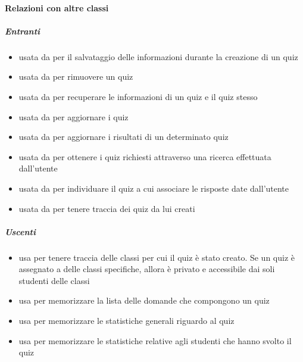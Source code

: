 \paragraph{Relazioni con altre classi}
\subparagraph{Entranti}
\begin{itemize}
\item usata da  per il salvataggio delle informazioni durante la creazione di un quiz
\item usata da  per rimuovere un quiz
\item usata da  per recuperare le informazioni di un quiz e il quiz stesso
\item usata da  per aggiornare i quiz
\item usata da  per aggiornare i risultati di un determinato quiz
\item usata da  per ottenere i quiz richiesti attraverso una ricerca effettuata dall'utente
\item usata da  per individuare il quiz a cui associare le risposte date dall'utente
\item usata da  per tenere traccia dei quiz da lui creati
\end{itemize}
\subparagraph{Uscenti}
\begin{itemize}
\item usa  per tenere traccia delle classi per
cui il quiz è stato creato. Se un quiz è assegnato a delle classi specifiche, allora è privato e
accessibile dai soli studenti delle classi
\item usa  per memorizzare la lista delle domande che compongono un quiz
\item usa  per memorizzare le statistiche generali riguardo al quiz
\item usa  per memorizzare le statistiche relative agli studenti che hanno svolto il quiz
\end{itemize}
